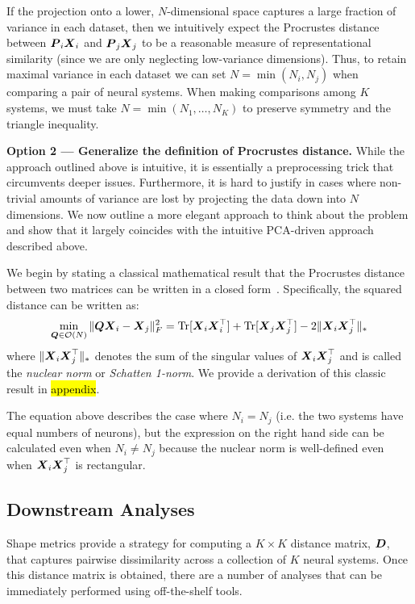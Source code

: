 If the projection onto a lower, $N$-dimensional space captures a large fraction of variance in each dataset, then we intuitively expect the Procrustes distance between $\boldsymbol{P}_i \boldsymbol{X}_i$ and $\boldsymbol{P}_j \boldsymbol{X}_j$ to be a reasonable measure of representational similarity (since we are only neglecting low-variance dimensions).
Thus, to retain maximal variance in each dataset we can set $N = \min(N_i, N_j)$ when comparing a pair of neural systems.
When making comparisons among $K$ systems, we must take $N = \min(N_1, \dots, N_K)$ to preserve symmetry and the triangle inequality.

\textbf{Option 2 --- Generalize the definition of Procrustes distance.}
While the approach outlined above is intuitive, it is essentially a preprocessing trick that circumvents deeper issues.
Furthermore, it is hard to justify in cases where non-trivial amounts of variance are lost by projecting the data down into $N$ dimensions.
We now outline a more elegant approach to think about the problem and show that it largely coincides with the intuitive PCA-driven approach described above.

We begin by stating a classical mathematical result that the Procrustes distance between two matrices can be written in a closed form~\parencite{schonemann1966generalized}.
Specifically, the squared distance can be written as:
\begin{equation}
\label{eq:procrustes-closed-form-1}
\min_{\boldsymbol{Q} \in \mathcal{O}(N)} \Vert \boldsymbol{Q} \boldsymbol{X}_i - \boldsymbol{X}_j \Vert_F^2 = \operatorname*{Tr}[ \boldsymbol{X}_i \boldsymbol{X}_i^\top ] + \operatorname*{Tr}[ \boldsymbol{X}_j \boldsymbol{X}_j^\top ] - 2 \Vert \boldsymbol{X}_i \boldsymbol{X}_j^\top \Vert_*
\end{equation}
where $\Vert \boldsymbol{X}_i \boldsymbol{X}_j^\top \Vert_*$ denotes the sum of the singular values of $\boldsymbol{X}_i \boldsymbol{X}_j^\top$ and is called the \textit{nuclear norm} or \textit{Schatten 1-norm}.
We provide a derivation of this classic result in \hl{appendix}.

The equation above describes the case where $N_i = N_j$ (i.e. the two systems have equal numbers of neurons), but the expression on the right hand side can be calculated even when $N_i \neq N_j$ because the nuclear norm is well-defined even when $\boldsymbol{X}_i \boldsymbol{X}_j^\top$ is rectangular.


\subsection{Downstream Analyses}

Shape metrics provide a strategy for computing a $K \times K$ distance matrix, $\boldsymbol{D}$, that captures pairwise dissimilarity across a collection of $K$ neural systems.
Once this distance matrix is obtained, there are a number of analyses that can be immediately performed using off-the-shelf tools.

